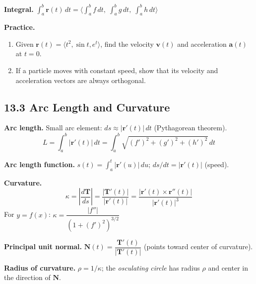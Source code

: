 \documentclass[12pt]{article}
\theoremstyle{compact}
\renewcommand{\vec}[1]{\mathbf{#1}}
\newcommand{\vv}[1]{\langle #1 \rangle}
\begin{document}
\textbf{Integral.} $\int_a^b \vec{r}(t)\,dt = \vv{\int_a^b f\,dt,\;\int_a^b g\,dt,\;\int_a^b h\,dt}$

\medskip\textbf{Practice.}
\begin{enumerate}[noitemsep]
  \item Given $\vec{r}(t)=\langle t^2,\sin t,e^t\rangle$, find the velocity $\vec{v}(t)$ and acceleration $\vec{a}(t)$ at $t=0$.
  \item If a particle moves with constant speed, show that its velocity and acceleration vectors are always orthogonal.
\end{enumerate}

\subsection{13.3 Arc Length and Curvature}

\textbf{Arc length.} Small arc element: $ds\approx |\vec{r}'(t)|\,dt$ (Pythagorean theorem).
\[
L = \int_a^b |\vec{r}'(t)|\,dt = \int_a^b \sqrt{(f')^2+(g')^2+(h')^2}\,dt
\]

\textbf{Arc length function.} $s(t)=\int_a^t |\vec{r}'(u)|\,du$; \quad $ds/dt=|\vec{r}'(t)|$ (speed).

\textbf{Curvature.}
\[
\kappa = \left|\frac{d\vec{T}}{ds}\right| = \frac{|\vec{T}'(t)|}{|\vec{r}'(t)|} = \frac{|\vec{r}'(t)\times\vec{r}''(t)|}{|\vec{r}'(t)|^3}
\]
For $y=f(x)$: $\kappa = \dfrac{|f''|}{(1+(f')^2)^{3/2}}$

\textbf{Principal unit normal.} $\vec{N}(t) = \dfrac{\vec{T}'(t)}{|\vec{T}'(t)|}$ (points toward center of curvature).

\textbf{Radius of curvature.} $\rho = 1/\kappa$; the \emph{osculating circle} has radius $\rho$ and center in the direction of $\vec{N}$.
\end{document}
